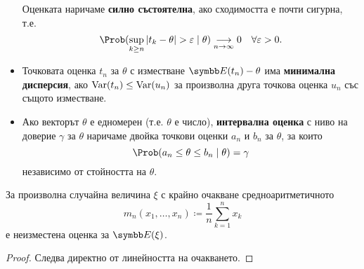 \documentclass[
  numbers=endperiod,
  headings=standardclasses,
  bibliography=totocnumbered,
]{scrartcl}
\begin{document}
\begin{definition}[Оценки]
\begin{itemize}
    Оценката наричаме \textbf{силно състоятелна}, ако сходимостта е почти сигурна, т.е.
    \begin{equation*}
      \Prob(\sup_{k \geq n} \Abs{t_k - \theta} > \varepsilon \mid \theta) \Conv[n \to \infty]{} 0\quad\forall \varepsilon > 0.
    \end{equation*}

    \item Точковата оценка \( t_n \) за \( \theta \) с изместване \( \Expect(t_n) - \theta \) има \textbf{минимална дисперсия}, ако \( \operatorname{Var}(t_n) \leq \operatorname{Var}(u_n) \) за произволна друга точкова оценка \( u_n \) със същото изместване.

    \item Ако векторът \( \theta \) е едномерен (т.е. \( \theta \) е число), \textbf{интервална оценка} с ниво на доверие \( \gamma \) за \( \theta \) наричаме двойка точкови оценки \( a_n \) и \( b_n \) за \( \theta \), за които
    \begin{equation*}
      \Prob(a_n \leq \theta \leq b_n \mid \theta) = \gamma
    \end{equation*}
    независимо от стойността на \( \theta \).
  \end{itemize}
\end{definition}

\begin{proposition}\label{thm:mean_is_unbiased_estimator}
  За произволна случайна величина \( \xi \) с крайно очакване средноаритметичното
  \begin{equation*}
    m_n(x_1, \ldots, x_n) \coloneqq \frac 1 n \sum_{k=1}^n x_k
  \end{equation*}
  е неизместена оценка за \( \Expect(\xi) \).
\end{proposition}
\begin{proof}
  Следва директно от линейността на очакването.
\end{proof}
\end{document}
